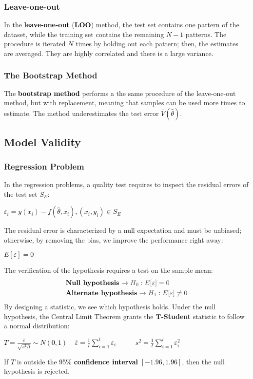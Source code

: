 \documentclass{article}
\newcommand{\bb}[1]{\textcolor{black}{\textbf{#1}}}
\newcommand{\rr}[1]{\textcolor{black}{#1}}
\newcommand{\cc}[1]{\begin{center}\textcolor{black}{#1}\end{center}}
\begin{document}
\subsubsection{Leave-one-out}
In the \bb{leave-one-out} (\bb{LOO}) method, the test set contains one pattern of the dataset, while the training set contains the remaining \rr{$N - 1$} patterns. The procedure is iterated \rr{$N$} times by holding out each pattern; then, the estimates are averaged. They are highly correlated and there is a large variance. 
\subsubsection{The Bootstrap Method}
The \bb{bootstrap method} performs a the same procedure of the leave-one-out method, but with replacement, meaning that samples can be used more times to estimate. The method underestimates the test error \rr{$\bar{V}(\hat{\theta})$}.

\subsection{Model Validity}
\subsubsection{Regression Problem}
In the regression problems, a quality test requires to inspect the residual errors of the test set \rr{$S_E$}:
\cc{$\varepsilon_i = y(x_i)- f(\hat{\theta},x_i), (x_i,y_i) \in S_E$}
The residual error is characterized by a null expectation and must be unbiased; otherwise, by removing the bias, we improve the performance right away:
\cc{$E[\varepsilon] = 0$}
The verification of the hypothesis requires a test on the sample mean:
\begin{align*}
    &\text{\bb{Null hypothesis}} \ \textcolor{darkgray}{\rightarrow H_0 : E[\varepsilon] = 0} \\
    &\text{\bb{Alternate hypothesis}} \ \textcolor{darkgray}{\rightarrow H_1 : E[\varepsilon] \neq 0}
\end{align*}
By designing a statistic, we see which hypothesis holds. Under the null hypothesis, the Central Limit Theorem grants the $\boldsymbol{T}$\textbf{-Student} statistic to follow a normal distribution:
\cc{$T = \displaystyle\frac{\bar{\varepsilon}}{\sqrt{{s^2 / l}}}\sim N(0,1) \ \ \ \ \ \bar{\varepsilon}=\displaystyle\frac{1}{l}\displaystyle\sum^l_{i = 1}\varepsilon_i$ \ \ \ \ \ $s^2 = \displaystyle\frac{1}{l}\displaystyle\sum^l_{i =1 } \varepsilon^2_i$}
If \rr{$T$} is outside the \rr{95\%} \bb{confidence interval} \rr{$[-1.96, 1.96]$}, then the null hypothesis is rejected.
\end{document}
